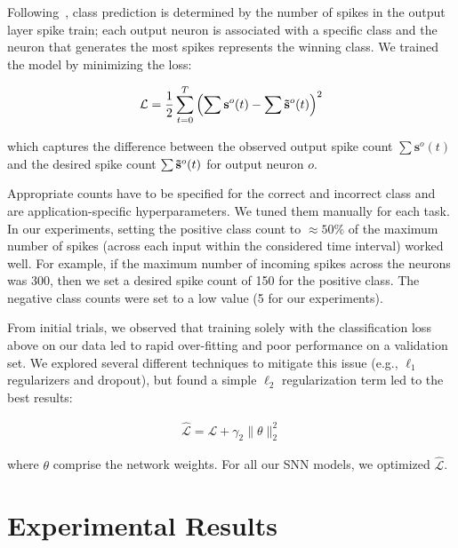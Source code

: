 \documentclass[fyp]{socreport}
\begin{document}
Following~\cite{NIPS2018_7415}, class prediction is determined by the
number of spikes in the output layer spike train; each output neuron is
associated with a specific class and the neuron that generates the most spikes
represents the winning class. We trained the model by minimizing the loss:

\begin{align}
    \mathcal{L} = \frac{1}{2} \sum_{t=0}^T \left( \sum \mathbf{s}^o(t) - \sum \mathbf{\Tilde{s}}^o(t) \right)^2
\end{align}

which captures the difference between the observed output spike count
$\sum \mathbf{s}^o(t)$ and the desired spike count
$\sum \mathbf{\Tilde{s}}^o(t)$ for output neuron $o$.

Appropriate counts have to be specified for the correct and incorrect class and
are application-specific hyperparameters. We tuned them manually for each task.
In our experiments, setting the positive class count to $\approx 50\%$ of the
maximum number of spikes (across each input within the considered time interval)
worked well. For example, if the maximum number of incoming spikes across the
neurons was 300, then we set a desired spike count of 150 for the positive
class. The negative class counts were set to a low value (5 for our
experiments).

From initial trials, we observed that training solely with the classification
loss above on our data led to rapid over-fitting and poor performance on a
validation set. We explored several different techniques to mitigate this issue
(e.g., $\ell_1$ regularizers and dropout), but found a simple $\ell_2$
regularization term led to the best results:

\begin{align}
    \mathcal{\hat{L}} = \mathcal{L} +  \gamma_2 \| \theta \|^2_2
\end{align}

where $\theta$ comprise the network weights. For all our SNN models, we
optimized $\mathcal{\hat{L}}$.

\chapter{Experimental Results\label{cha:exp_results}}
\end{document}
